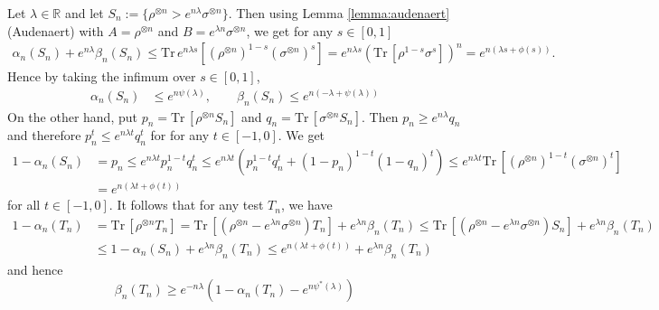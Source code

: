\documentclass[12pt]{article}
\theoremstyle{definition}
\theoremstyle{remark}
\def \Tr{\mathrm{Tr}\,}
\begin{document}
Let $\lambda\in \mathbb R$ and let $S_n:=\{\rho^{\otimes n}>e^{n\lambda}\sigma^{\otimes
n}\}$. Then using Lemma \ref{lemma:audenaert} (Audenaert) with $A=\rho^{\otimes n}$ and
$B=e^{\lambda n}\sigma^{\otimes n}$, we get  for any $s\in [0,1]$
\begin{align}
\alpha_n(S_n)+e^{n\lambda}\beta_n(S_n)\le \Tr e^{n\lambda s}[(\rho^{\otimes n})^{1-s}(\sigma^{\otimes
n})^s]=e^{n\lambda s}(\Tr[\rho^{1-s}\sigma^s])^n=e^{n(\lambda s+\phi(s))}.
\end{align}
Hence by taking the infimum over $s\in [0,1]$,
\begin{align}
\alpha_n(S_n)&\le e^{n\psi(\lambda)},\qquad\beta_n(S_n)\le e^{n(-\lambda
+\psi(\lambda))}\label{eq:direct}
\end{align}
On the other hand, put $p_n=\Tr[\rho^{\otimes n}S_n]$ and $q_n=\Tr[\sigma^{\otimes
n}S_n]$. Then $p_n \ge e^{n\lambda}q_n$ and therefore $p_n^t\le e^{n\lambda t}q_n^t$ for 
for any $t\in [-1,0]$. We get
\begin{align*}
1-\alpha_n(S_n)&=p_n\le e^{n\lambda t}p_n^{1-t}q_n^{t}\le e^{n\lambda
t}(p_n^{1-t}q_n^{t}+(1-p_n)^{1-t}(1-q_n)^{t})\le e^{n\lambda t}\Tr[(\rho^{\otimes
n})^{1-t}(\sigma^{\otimes n})^t]\\
&=e^{n(\lambda t+\phi(t))}
\end{align*}
for all $t\in [-1,0]$. It follows that for any test $T_n$, we have
\begin{align*}
1-\alpha_n(T_n)&=\Tr[\rho^{\otimes n} T_n]=\Tr[(\rho^{\otimes n}-e^{\lambda
n}\sigma^{\otimes n})T_n]+e^{\lambda n}\beta_n(T_n)\le \Tr[(\rho^{\otimes n}-e^{\lambda
n}\sigma^{\otimes n})S_n]+e^{\lambda n}\beta_n(T_n)\\
&\le 1-\alpha_n(S_n)+e^{\lambda n}\beta_n(T_n)\le e^{n(\lambda t+\phi(t))}+e^{\lambda n}\beta_n(T_n)
\end{align*}
and hence
\begin{equation}\label{eq:converse}
\beta_n(T_n)\ge e^{-n\lambda}(1-\alpha_n(T_n)-e^{n\psi^*(\lambda)})
\end{equation}
\end{document}
